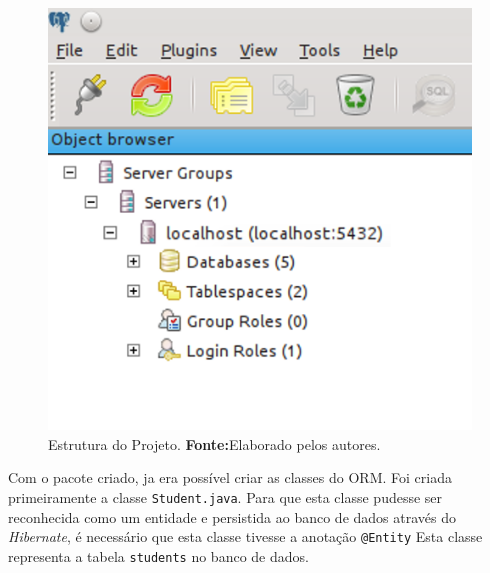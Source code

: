\begin{figure}[h!]
	\centerline{\includegraphics[scale=0.8]{./imagens/2_q_metodologico/4_procedimentos_resultados/43_webservice/432_desenvolvimento/desws.png}}
	\caption[Estrutura do Projeto]{Estrutura do Projeto.
		\textbf{Fonte:}Elaborado pelos autores.}
	\label{fig:desws1}
\end{figure}
		
	\par Com o pacote criado, ja era possível criar as classes do ORM. Foi criada
primeiramente a classe \texttt{Student.java}. Para que esta classe pudesse ser
reconhecida como um entidade e persistida ao banco de dados através do
\textit{Hibernate}, é necessário que esta classe tivesse a anotação
\texttt{@Entity} Esta classe representa a tabela \texttt{students} no banco de dados.





